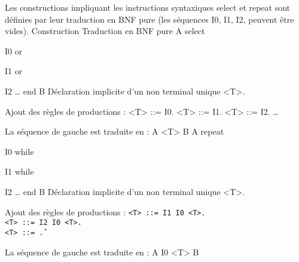 Les constructions impliquant les instructions syntaxiques select et repeat sont définies par leur traduction en BNF pure (les séquences I0, I1, I2, peuvent être vides).
Construction	Traduction en BNF pure
A
select

I0
or

I1
or

I2
…
end
B	Déclaration implicite d'un non terminal unique <T>.

Ajout des règles de productions :
<T> ::= I0.
<T> ::= I1.
<T> ::= I2.
…

La séquence de gauche est traduite en : A <T> B
A
repeat

I0
while

I1
while

I2
…
end
B	Déclaration implicite d'un non terminal unique <T>.

Ajout des règles de productions :
\texttt{<T> ::= I1 I0 <T>.\\<T> ::= I2 I0 <T>.\\<T> ::= \^.}

La séquence de gauche est traduite en : A I0 <T> B
